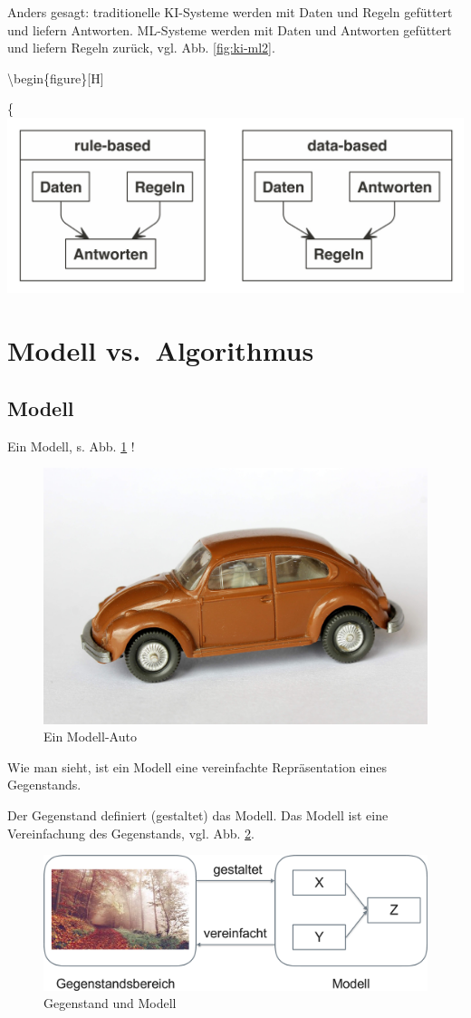 \documentclass[
]{book}
\begin{document}
Anders gesagt: traditionelle KI-Systeme werden mit Daten und Regeln gefüttert und liefern Antworten.
ML-Systeme werden mit Daten und Antworten gefüttert und liefern Regeln zurück, vgl. Abb. \ref{fig:ki-ml2}.

\textbackslash begin\{figure\}{[}H{]}

\{\centering \includegraphics[width=0.7\linewidth]{chunk-img/ki-ml2-1}

\hypertarget{modell-vs.-algorithmus}{%
\section{Modell vs.~Algorithmus}\label{modell-vs.-algorithmus}}

\hypertarget{modell}{%
\subsection{Modell}\label{modell}}

Ein Modell, s. Abb. \ref{fig:vw} \citep{spurzem_vw_2017}!

\begin{figure}[H]

{\centering \includegraphics[width=0.33\linewidth]{img/vw_modell} 

}

\caption{Ein Modell-Auto}\label{fig:vw}
\end{figure}

Wie man sieht, ist ein Modell eine vereinfachte Repräsentation eines Gegenstands.

Der Gegenstand definiert (gestaltet) das Modell. Das Modell ist eine Vereinfachung des Gegenstands, vgl. Abb. \ref{fig:modell}.

\begin{figure}[H]

{\centering \includegraphics[width=0.7\linewidth]{img/modell-crop} 

}

\caption{Gegenstand und Modell}\label{fig:modell}
\end{figure}
\end{document}
